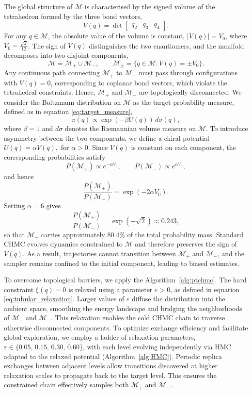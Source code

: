 \documentclass[12pt]{article}
\begin{document}
The global structure of $\mathcal{M}$ is characterised by the signed volume of the tetrahedron formed by the three bond vectors,
\[
  V(q) = \det\!\begin{bmatrix} q_2 & q_3 & q_4 \end{bmatrix}.
\]
For any $q \in \mathcal{M}$, the absolute value of the volume is constant, $|V(q)| = V_0$, where $V_0 = \frac{\sqrt{2}}{12}$. The sign of $V(q)$ distinguishes the two enantiomers, and the manifold decomposes into two disjoint components,
\[
  \mathcal{M} = \mathcal{M}_+ \cup \mathcal{M}_-, \qquad 
  \mathcal{M}_\pm = \{ q \in \mathcal{M} : V(q) = \pm V_0 \}.
\]
Any continuous path connecting $\mathcal{M}_+$ to $\mathcal{M}_-$ must pass through configurations with $V(q)=0$, corresponding to coplanar bond vectors, which violate the tetrahedral constraints. Hence, $\mathcal{M}_+$ and $\mathcal{M}_-$ are topologically disconnected.
We consider the Boltzmann distribution on $\mathcal{M}$ as the target probability measure, defined as in equation \eqref{eq:target_measure},
\[
  \pi(q) \propto \exp(-\beta U(q))\, d\sigma(q),
\]
where $\beta=1$ and $d\sigma$ denotes the Riemannian volume measure on $\mathcal{M}$. To introduce asymmetry between the two components, we define a chiral potential
\(
  U(q) = \alpha V(q), 
\) for $\alpha > 0.$
Since $V(q)$ is constant on each component, the corresponding probabilities satisfy
\[
  P(\mathcal{M}_+) \propto e^{-\alpha V_0}, \qquad
  P(\mathcal{M}_-) \propto e^{\alpha V_0},
\]
and hence
\[
  \frac{P(\mathcal{M}_+)}{P(\mathcal{M}_-)} = \exp(-2\alpha V_0).
\]
Setting $\alpha = 6$ gives
\[
  \frac{P(\mathcal{M}_+)}{P(\mathcal{M}_-)} = \exp(-\sqrt{2}) \approx 0.243,
\]
so that $\mathcal{M}_-$ carries approximately $80.4\%$ of the total probability mass.
Standard CHMC evolves dynamics constrained to $\mathcal{M}$ and therefore preserves the sign of $V(q)$. As a result, trajectories cannot transition between $\mathcal{M}_+$ and $\mathcal{M}_-$, and the sampler remains confined to the initial component, leading to biased estimates.


To overcome topological barriers, we apply the Algorithm~\ref{alg:ptchmc}. The hard constraint $\xi(q)=0$ is relaxed using a parameter $\varepsilon > 0$, as defined in equation \eqref{eq:tubular_relaxation}. Larger values of $\varepsilon$ diffuse the distribution into the ambient space, smoothing the energy landscape and bridging the neighborhoods of $\mathcal{M}_+$ and $\mathcal{M}_-$. This relaxation enables the cold CHMC chain to traverse otherwise disconnected components.
To optimize exchange efficiency and facilitate global exploration, we employ a ladder of relaxation parameters, $\varepsilon \in \{0.05,\, 0.15,\, 0.30,\, 0.60\}$, with each level evolving independently via HMC adapted to the relaxed potential (Algorithm~\ref{alg:HMC}). Periodic replica exchanges between adjacent levels allow transitions discovered at higher relaxation scales to propagate back to the target level. This ensures the constrained chain effectively samples both $\mathcal{M}_+$ and $\mathcal{M}_-$.
\end{document}
